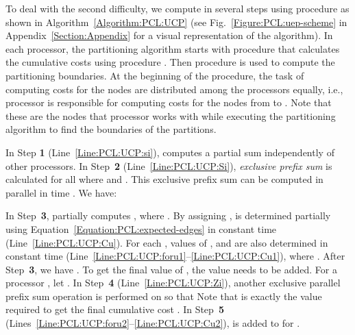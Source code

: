 \documentclass[conference,letterpaper,10pt]{IEEEtran}
\newcommand{\Figure}{Fig.\xspace}
\begin{document}
To deal with the second difficulty, we compute  in several steps using procedure  as shown in Algorithm~\ref{Algorithm:PCL:UCP} (see \Figure~\ref{Figure:PCL:uep-scheme} in Appendix~\ref{Section:Appendix} for a visual representation of the algorithm). In each processor, the partitioning algorithm starts with procedure  that calculates the cumulative costs using procedure  . Then procedure  is used to compute the partitioning boundaries.
At the beginning of the  procedure, the task of computing costs for the  nodes are distributed among the  processors equally, i.e., processor  is responsible for computing costs for the nodes  from  to . Note that these are the nodes that processor  works with while executing the partitioning algorithm to find the boundaries of the partitions. 

In Step \textbf{1} (Line~\ref{Line:PCL:UCP:si}),  computes a partial sum  independently of other processors. In Step~\textbf{2} (Line~\ref{Line:PCL:UCP:Si}),  \emph{exclusive prefix sum}  is calculated for all  where  and . This exclusive prefix sum can be computed in parallel in  time \cite{Sanders2006}. We have:

In Step~\textbf{3},  partially computes , where . By assigning ,   is determined partially using Equation~\ref{Equation:PCL:expected-edges} in constant time (Line~\ref{Line:PCL:UCP:Cu}). For each , values of  ,  and  are also determined in constant time (Line~\ref{Line:PCL:UCP:foru1}--\ref{Line:PCL:UCP:Cu1}), where .  
After Step~\textbf{3}, we have . To get the final value of , the value   needs to be added. For a processor , let . In Step~\textbf{4} (Line~\ref{Line:PCL:UCP:Zi}), another exclusive parallel prefix sum operation is performed on  so that  Note that  is exactly the value required to get the final cumulative cost . In Step~\textbf{5} (Lines~\ref{Line:PCL:UCP:foru2}--\ref{Line:PCL:UCP:Cu2}),  is added to  for . 
\end{document}
